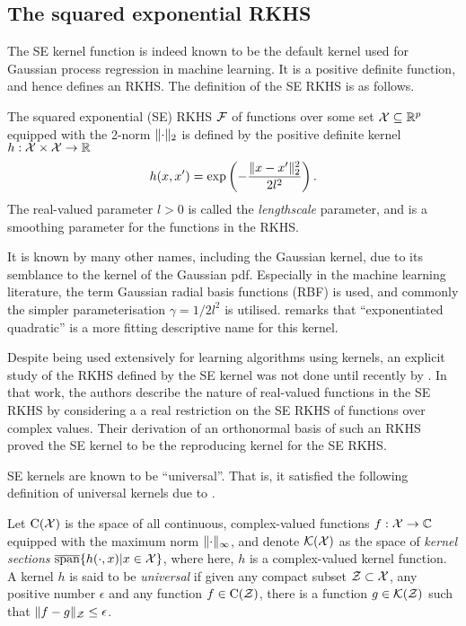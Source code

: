 \subsection{The squared exponential RKHS}

The \gls{SE} kernel function is indeed known to be the default kernel used for Gaussian process regression in machine learning.
It is a positive definite function, and hence defines an RKHS.
The definition of the \gls{SE} RKHS is as follows.

\begin{definition}
  The squared exponential (SE) RKHS ${\mathcal F}$ of functions over some set ${\mathcal X} \subseteq \mathbb{R}^p$ equipped with the 2-norm $\lVert\cdot\rVert_2$ is defined by the positive definite kernel $h:{\mathcal X}\times{\mathcal X}\to\mathbb{R}$ 
  \[
    h(x,x') = \exp\left(-\frac{\lVert x-x'\rVert_2^2}{2l^2} \right).
  \]
  The real-valued parameter $l > 0$ is called the \emph{lengthscale} parameter, and is a smoothing parameter for the functions in the RKHS.
\end{definition}

It is known by many other names, including the Gaussian kernel, due to its semblance to the kernel of the Gaussian pdf. 
Especially in the machine learning literature, the term Gaussian radial basis functions (RBF) is used, and commonly the simpler parameterisation $\gamma = 1 / 2l^2$ is utilised.
\citet{duvenaud2014automatic} remarks that ``exponentiated quadratic'' is a more fitting descriptive name for this kernel.

Despite being used extensively for learning algorithms using kernels, an explicit study of the RKHS defined by the SE kernel was not done until recently by \citet{steinwart2006explicit}.
In that work, the authors describe the nature of real-valued functions in the SE RKHS by considering a a real restriction on the SE RKHS of functions over complex values.
Their derivation of an orthonormal basis of such an RKHS proved the SE kernel to be the reproducing kernel for the SE RKHS.


SE kernels are known to be ``universal''. That is, it satisfied the following definition of universal kernels due to \citet{micchelli2006universal}.

\begin{definition}
  Let $\text{C}({\mathcal X})$ is the space of all continuous, complex-valued functions $f:{\mathcal X}\to\mathbb{C}$ equipped with the maximum norm $\lVert\cdot\rVert_\infty$, and denote ${\mathcal K}({\mathcal X})$ as the space of \emph{kernel sections} $ \overline{\text{span}}\{ h(\cdot,x) | x \in {\mathcal X} \}$, where here, $h$ is a complex-valued kernel function.
  A kernel $h$ is said to be \emph{universal} if given any compact subset ${\mathcal Z} \subset {\mathcal X}$, any positive number $\epsilon$ and any function $f \in \text{C}({\mathcal Z})$, there is a function $g \in {\mathcal K}({\mathcal Z})$ such that $\lVert f-g\rVert_{\mathcal Z} \leq \epsilon$.
\end{definition}

